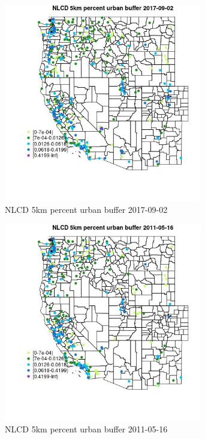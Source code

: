 \begin{figure} 
\centering  
\includegraphics[width=0.77\textwidth]{Code_Outputs/Report_ML_input_PM25_Step4_part_e_de_duplicated_aves_compiled_2019-05-21wNAs_MapObsNLCD_5km_percent_urban_buffer2017-09-02.jpg} 
\caption{\label{fig:Report_ML_input_PM25_Step4_part_e_de_duplicated_aves_compiled_2019-05-21wNAsMapObsNLCD_5km_percent_urban_buffer2017-09-02}NLCD 5km percent urban buffer 2017-09-02} 
\end{figure} 
 

\begin{figure} 
\centering  
\includegraphics[width=0.77\textwidth]{Code_Outputs/Report_ML_input_PM25_Step4_part_e_de_duplicated_aves_compiled_2019-05-21wNAs_MapObsNLCD_5km_percent_urban_buffer2011-05-16.jpg} 
\caption{\label{fig:Report_ML_input_PM25_Step4_part_e_de_duplicated_aves_compiled_2019-05-21wNAsMapObsNLCD_5km_percent_urban_buffer2011-05-16}NLCD 5km percent urban buffer 2011-05-16} 
\end{figure} 
 


